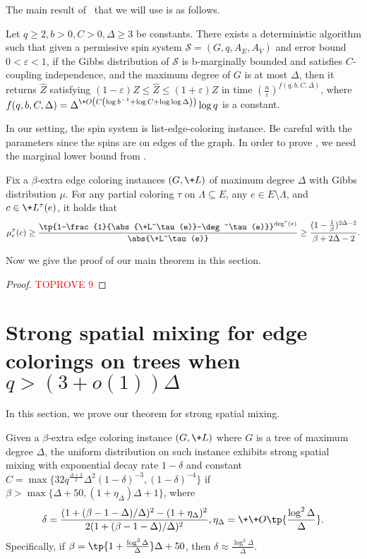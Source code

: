 \documentclass[a4paper,11pt]{article}
\begin{document}
The main result of~\cite{CFGZZ24} that we will use is as follows.
\begin{theorem}\label{thm:ci-FPTAS}
    Let $q \geq 2, b>0, C>0, \Delta \geq 3$ be constants. There exists a deterministic algorithm such that given a permissive spin system $\mathcal{S}=\left(G, q, A_E, A_V\right)$ and error bound $0<\varepsilon<1$, if the Gibbs distribution of $\mathcal{S}$ is b-marginally bounded and satisfies $C$-coupling independence, and the maximum degree of $G$ is at most $\Delta$, then it returns $\hat{Z}$ satisfying $(1-\varepsilon) Z \leq \hat{Z} \leq(1+\varepsilon) Z$ in time $\left(\frac{n}{\varepsilon}\right)^{f(q, b, C, \Delta)}$, where $f(q, b, C, \Delta)=\Delta^{\+O\left(C\left(\log b^{-1}+\log C+\log \log \Delta\right)\right)} \log q$ is a constant.
\end{theorem}
In our setting, the spin system is list-edge-coloring instance. Be careful with the parameters since the spins are on edges of the graph. In order to prove , we need the marginal lower bound from \cite{GKM15}.
\begin{lemma} \label{lem:marginal-bound-gkm}
Fix a $\beta$-extra edge coloring instances $(G,\+L)$ of maximum degree $\Delta$ with Gibbs distribution $\mu$. For any partial coloring $\tau$ on $\Lambda \subseteq E$, any $e \in E\setminus \Lambda$, and $c \in \+L^\tau(e)$, it holds that
	\[
		\mu^{\tau}_e(c) \geq \frac{\tp{1-\frac{1}{\abs{\+L^\tau(e)}-\deg^\tau(e)}}^{\deg^\tau(e)}}{\abs{\+L^\tau(e)}}\ge \frac{(1-\frac{1}{\beta})^{2\Delta-2}}{\beta+2\Delta-2} .
	\]
 \end{lemma}
Now we give the proof of our main theorem in this section.
\begin{proof}\textcolor{red}{TOPROVE 9}\end{proof}

 \section{Strong spatial mixing for edge colorings on trees when $q>(3+o(1))\Delta$}\label{sec:ssm}

In this section, we prove our theorem for strong spatial mixing.

\begin{theorem}\label{thm:SSM}
    Given a $\beta$-extra edge coloring instance $(G,\+L)$ where $G$ is a tree of maximum degree $\Delta$, the uniform distribution on such instance exhibits strong spatial mixing with exponential decay rate $1-\delta$ and constant $C = \max\{32q^{\frac{\Delta + 2}2}\Delta^2(1-\delta)^{-3},(1-\delta)^{-4}\}$ if $\beta > \max\{\Delta + 50, (1 + \eta_\Delta)\Delta + 1\}$, where
    \[
         \delta = \frac{(1 + (\beta - 1 -\Delta)/\Delta)^2 - (1+\eta_{\Delta})^2}{2(1 + (\beta - 1 -\Delta)/\Delta)^2}, \eta_{\Delta} = \+\+O\tp{\frac{\log^2 \Delta}{\Delta}}.
    \]
    Specifically, if $\beta = \tp{1 + \frac{\log^3 \Delta}{\Delta}}\Delta + 50$, then $\delta \approx \frac{\log^3 \Delta}{\Delta}$.
 \end{theorem}
 
\end{document}

